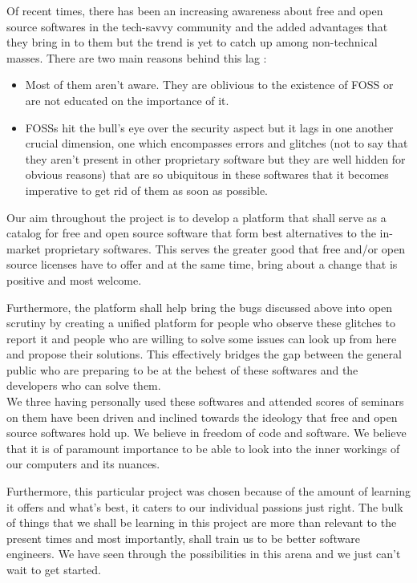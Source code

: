 \begin{abstractslong}


Of recent times, there has been an increasing awareness about free and open source softwares in the tech-savvy community and the added advantages that they bring in to them but the trend is yet to catch up among non-technical masses. There are two main reasons behind this lag : 
\begin{itemize}
\item Most of them aren't aware. They are oblivious to the existence of FOSS or are not educated on the importance of it.
\item FOSSs hit the bull’s eye over the security aspect but it lags in one another crucial dimension, one which encompasses errors and glitches (not to say that they aren't present in other proprietary software but they are well hidden for obvious reasons) that are so ubiquitous in these softwares that it becomes imperative to get rid of them as soon as possible.
\end{itemize}


Our aim throughout the project is to develop a platform that shall serve as a catalog for free and open source software that form best alternatives to the in-market proprietary softwares. This serves the greater good that free and/or open source licenses have to offer and at the same time, bring about a change that is positive and most welcome.

Furthermore, the platform shall help bring the bugs discussed above into open scrutiny by creating a unified platform for people who observe these glitches to report it and people who are willing to solve some issues can look up from here and propose their solutions. This effectively bridges the gap between the general public who are preparing to be at the behest of these softwares and the developers who can solve them.
\\

We three having personally used these softwares and attended scores of seminars on them have been driven and inclined towards the ideology that free and open source softwares hold up. We believe in freedom of code and software. We believe that it is of paramount importance to be able to look into the inner workings of our computers and its nuances.

Furthermore, this particular project was chosen because of the amount of learning it offers and what’s best, it caters to our individual passions just right. The bulk of things that we shall be learning in this project are more than relevant to the present times and most importantly, shall train us to be better software engineers. We have seen through the possibilities in this arena and we just can’t wait to get started.
\end{abstractslong}